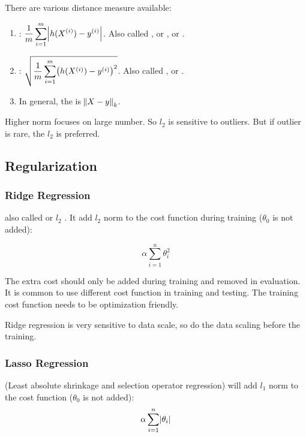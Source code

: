 There are various distance measure available:
\begin{enumerate}
    \item {}: $\displaystyle \frac{1}{m} \sum_{i=1}^m \abs{h(X^{(i)}) - y^{(i)}}$. Also called , or , or .
    \item {}: $\displaystyle \sqrt{\frac{1}{m} \sum_{i=1}^m \mleft(h(X^{(i)}) - y^{(i)} \mright)^2}$. Also called , or .
    \item In general, the  is $\norm{X - y}_k$.
\end{enumerate}

Higher norm focuses on large number. So $l_2$ is sensitive to outliers. But if outlier is rare, the $l_2$ is preferred.






\subsection{Regularization}

\subsubsection{Ridge Regression}

 also called  or $l_2$ . It add $l_2$ norm to the cost function during training ($\theta_0$ is not added):

\begin{equation}
	\alpha \sum_{i=1}^n \theta_i^2
\end{equation}


The extra cost should only be added during training and removed in evaluation. It is common to use different cost function in training and testing. The training cost function needs to be optimization friendly. 

Ridge regression is very sensitive to data scale, so do the data scaling before the training. 




\subsubsection{Lasso Regression}
 (Least absolute shrinkage and selection operator regression) will add $l_1$ norm to the cost function ($\theta_0$ is not added):
\begin{equation}
	\alpha \sum_{i=1}^n \abs{\theta_i}
\end{equation}

